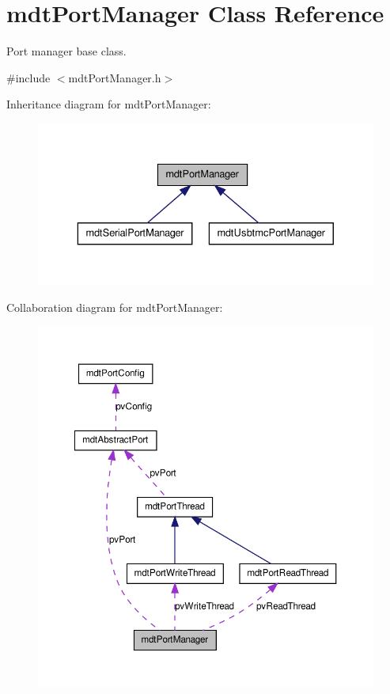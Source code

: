 \hypertarget{classmdt_port_manager}{
\section{mdtPortManager Class Reference}
\label{classmdt_port_manager}
}


Port manager base class.  




{\ttfamily \#include $<$mdtPortManager.h$>$}



Inheritance diagram for mdtPortManager:\nopagebreak
\begin{figure}[H]
\begin{center}
\leavevmode
\includegraphics[width=332pt]{classmdt_port_manager__inherit__graph}
\end{center}
\end{figure}


Collaboration diagram for mdtPortManager:\nopagebreak
\begin{figure}[H]
\begin{center}
\leavevmode
\includegraphics[width=362pt]{classmdt_port_manager__coll__graph}
\end{center}
\end{figure}
